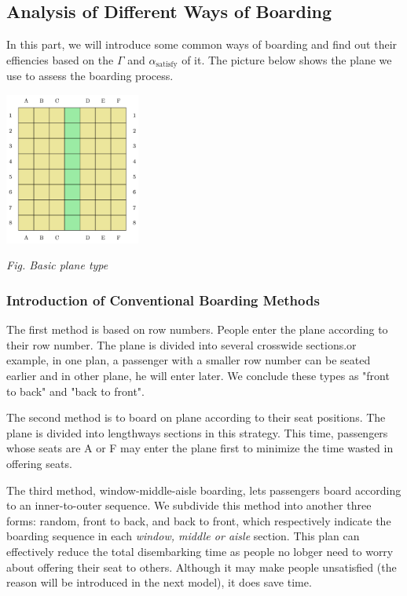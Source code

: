 \documentclass{article}
\theoremstyle{definition}
\theoremstyle{remark}
\numberwithin{equation}{section}
\begin{document}
	\subsection{Analysis of Different Ways of Boarding}
	In this part, we will introduce some common ways of boarding and find out their effiencies based on the $\Gamma$ and $\alpha_\text{satisfy}$ of it. The picture below shows the plane we use to assess the boarding process.

	\begin{center}
		\includegraphics[height=5cm]{planeempty.jpg}

		\small \textit{Fig. Basic plane type}
	\end{center}

	\subsubsection{Introduction of Conventional Boarding Methods}
	The first method is based on row numbers. People enter the plane according to their row number. The plane is divided into several crosswide sections.or example, in one plan, a passenger with a smaller row number can be seated earlier and in other plane, he will enter later. We conclude these types as "front to back" and "back to front".

	The second method is to board on plane according to their seat positions. The plane is divided into lengthways sections in this strategy. This time, passengers whose seats are A or F may enter the plane first to minimize the time wasted in offering seats.

	The third method, window-middle-aisle boarding, lets passengers board according to an inner-to-outer sequence. We subdivide this method into another three forms: random, front to back, and back to front, which respectively indicate the boarding sequence in each \textit{window, middle or aisle} section. This plan can effectively reduce the total disembarking time as people no lobger need to worry about offering their seat to others. Although it may make people unsatisfied (the reason will be introduced in the next model), it does save time.
\end{document}
